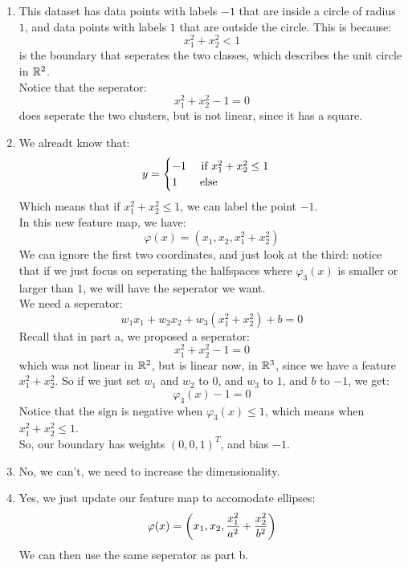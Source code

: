 \documentclass[12pt]{article}
\begin{document}
\begin{enumerate}[label = \letters]
\item 
    This dataset has data points with labels
    $-1$ that are inside a circle of radius $1$,
    and data points with labels $1$
    that are outside the circle.
    This is because:
    \[ x_1^2 + x_2^2 < 1 \]
    is the boundary that seperates the two classes,
    which describes the unit circle in $\mathbb{R}^2$. \\
    Notice that the seperator:
    \[ x_1^2 + x_2^2 - 1 = 0 \]
    does seperate the two clusters,
    but is not linear, since it has a square. \\
\item 
    We alreadt know that:
    \[ y = \begin{cases}  -1 \quad 
    \text{ if } x_1^2 + x_2^2 \leq 1 \\ 1 \qquad \text{else} \end{cases} \]
    Which means that if $x_1^2 + x_2^2 \leq 1$,
    we can label the point $-1$. \\
    In this new feature map, we have:
    \[ \varphi(x) = (x_1, x_2, x_1^2 + x_2^2) \]
    We can ignore the first two coordinates,
    and just look at the third: notice
    that if we just focus on seperating
    the halfspaces where $\varphi_3(x)$
    is smaller or larger than $1$,
    we will have the seperator we want. \\
    We need a seperator:
    \[ w_1x_1 + w_2x_2 + w_3(x_1^2 + x_2^2) + b = 0 \]
    Recall that in part a, we proposed a seperator:
    \[ x_1^2 + x_2^2 - 1 = 0 \]
    which was not linear in $\mathbb{R}^2$,
    but is linear now, in $\mathbb{R}^3$,
    since we have a feature $x_1^2 + x_2^2$.
    So if we just set $w_1$ and $w_2$ to $0$,
    and $w_3$ to $1$, and $b$ to $-1$, we get:
    \[ \varphi_3(x) - 1 = 0 \]
    Notice that the sign is negative when
    $\varphi_3(x) \leq 1$,
    which means when $x_1^2 + x_2^2 \leq 1$. \\
    So, our boundary has weights $(0, 0, 1)^T$,
    and bias $-1$. \\
\item 
    No, we can't, we need to increase the
    dimensionality.
\item 
    Yes, we just update our feature map
    to accomodate ellipses:
    \[ \varphi(x) = \left( x_1, x_2, 
    \dfrac{x_1^2}{a^2} + \dfrac{x_2^2}{b^2} \right) \]
    We can then use the same seperator as
    part b.
\end{enumerate}
\end{document}
